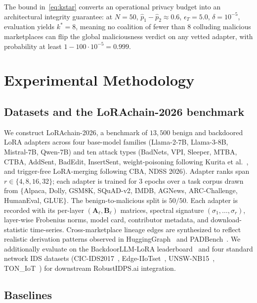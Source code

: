 \documentclass[12pt,a4paper]{article}
\theoremstyle{definition}
\theoremstyle{remark}
\newcommand{\benchname}{LoRAchain-2026}
\begin{document}
The bound in~\eqref{eq:kstar} converts an operational privacy budget into an architectural integrity guarantee: at $N = 50$, $\hat{p}_1 - \hat{p}_2 \approx 0.6$, $\epsilon_T = 5.0$, $\delta = 10^{-5}$, evaluation yields $k^* = 8$, meaning no coalition of fewer than $8$ colluding malicious marketplaces can flip the global maliciousness verdict on any vetted adapter, with probability at least $1 - 100 \cdot 10^{-5} = 0.999$.


\section{Experimental Methodology}
\label{sec:experiments}

\subsection{Datasets and the \benchname{} benchmark}

We construct \benchname{}, a benchmark of $13{,}500$ benign and backdoored LoRA adapters across four base-model families (Llama-2-7B, Llama-3-8B, Mistral-7B, Qwen-7B) and ten attack types (BadNets, VPI, Sleeper, MTBA, CTBA, AddSent, BadEdit, InsertSent, weight-poisoning following Kurita et al.~\cite{kurita2020weight}, and trigger-free LoRA-merging following CBA, NDSS 2026). Adapter ranks span $r \in \{4, 8, 16, 32\}$; each adapter is trained for $3$ epochs over a task corpus drawn from $\{$Alpaca, Dolly, GSM8K, SQuAD-v2, IMDB, AGNews, ARC-Challenge, HumanEval, GLUE$\}$. The benign-to-malicious split is $50/50$. Each adapter is recorded with its per-layer $(\mathbf{A}_\ell, \mathbf{B}_\ell)$ matrices, spectral signature $(\sigma_1,\ldots,\sigma_r)$, layer-wise Frobenius norms, model card, contributor metadata, and download-statistic time-series. Cross-marketplace lineage edges are synthesized to reflect realistic derivation patterns observed in HuggingGraph~\cite{rahman2025hugginggraph} and PADBench~\cite{sun2025peftguard}. We additionally evaluate on the BackdoorLLM-LoRA leaderboard~\cite{li2025backdoorllm} and four standard network IDS datasets (CIC-IDS2017~\cite{sharafaldin2018toward}, Edge-IIoTset~\cite{ferrag2022edge}, UNSW-NB15~\cite{moustafa2015unsw}, TON\_IoT~\cite{moustafa2021ton}) for downstream RobustIDPS.ai integration.

\subsection{Baselines}
\end{document}
